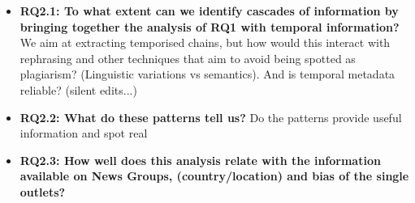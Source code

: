 \vspace{12px}

\begin{itemize}
    \item \textbf{RQ2.1: To what extent can we identify cascades of information by bringing together the analysis of RQ1 with temporal information?} We aim at extracting temporised chains, but how would this interact with rephrasing and other techniques that aim to avoid being spotted as plagiarism? (Linguistic variations vs semantics). And is temporal metadata reliable? (silent edits...)
    
    \item \textbf{RQ2.2: What do these patterns tell us?} Do the patterns provide useful information and spot real
    
    \item \textbf{RQ2.3: How well does this analysis relate with the information available on News Groups, (country/location) and bias of the single outlets?}
    
\end{itemize}